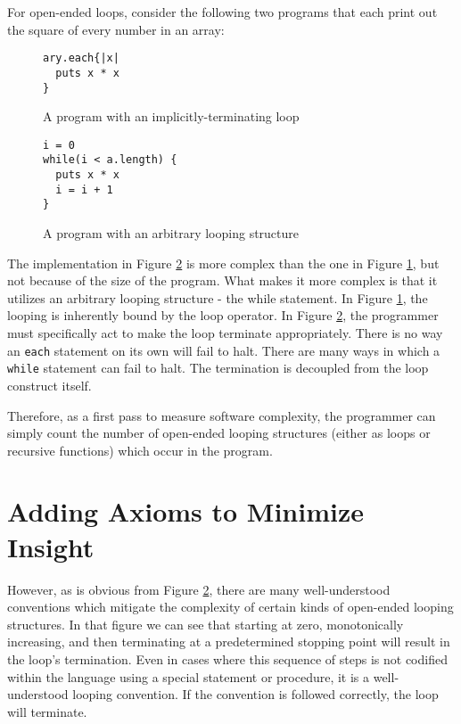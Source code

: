 For open-ended loops, consider the following two programs that each print out the square of every number in an array:

\begin{figure}[H]
\begin{mdframed}
\begin{verbatim}
ary.each{|x| 
  puts x * x
}
\end{verbatim}
\end{mdframed}
\caption{A program with an implicitly-terminating loop}
\label{fig:impterm}
\end{figure}

\begin{figure}[H]
\begin{mdframed}
\begin{verbatim}
i = 0
while(i < a.length) {
  puts x * x
  i = i + 1
}
\end{verbatim}
\end{mdframed}
\caption{A program with an arbitrary looping structure}
\label{fig:expterm}
\end{figure}

The implementation in Figure \ref{fig:expterm} is more complex than the one in Figure \ref{fig:impterm}, but not because of the size of the program.  What makes it more complex is that it utilizes an arbitrary looping structure - the while statement.  In Figure \ref{fig:impterm}, the looping is inherently bound by the loop operator.  In Figure \ref{fig:expterm}, the programmer must specifically act to make the loop terminate appropriately.  There is no way an \verb+each+ statement on its own will fail to halt.  There are many ways in which a \verb+while+ statement can fail to halt.  The termination is decoupled from the loop construct itself.

Therefore, as a first pass to measure software complexity, the programmer can simply count the number of open-ended looping structures (either as loops or recursive functions) which occur in the program.   

\section{Adding Axioms to Minimize Insight}

However, as is obvious from Figure \ref{fig:expterm}, there are many well-understood conventions which mitigate the complexity of certain kinds of open-ended looping structures.  In that figure we can see that starting at zero, monotonically increasing, and then terminating at a predetermined stopping point will result in the loop's termination. Even in cases where this sequence of steps is not codified within the language using a special statement or procedure, it is a well-understood looping convention.  If the convention is followed correctly, the loop will terminate.

